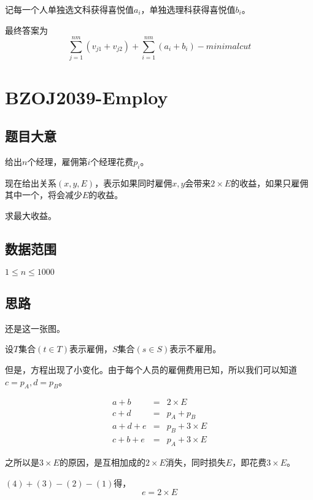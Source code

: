 \documentclass{ctexart}
\numberwithin{equation}{section}
\begin{document}
\begin{flushleft}
   记每一个人单独选文科获得喜悦值$a_i$，单独选理科获得喜悦值$b_i$。

   最终答案为$$\sum_{j=1}^{nm}(v_{j1}+v_{j2}) + \sum_{i=1}^{nm}(a_i+b_i) - minimalcut$$

   \newpage
     
   \section{BZOJ2039-Employ}
  \subsection{题目大意}
  给出$n$个经理，雇佣第$i$个经理花费$p_i$。

  现在给出关系$(x,y,E)$，表示如果同时雇佣$x,y$会带来$2\times E$的收益，如果只雇佣其中一个，将会减少$E$的收益。

  求最大收益。
  
  \subsection{数据范围}
  $1\le n \le 1000$
  \subsection{思路}
  还是这一张图。

  \begin{figure}[htb]        


  \end{figure}


  设$T$集合$(t\in T)$表示雇佣，$S$集合$(s\in S)$表示不雇用。

  但是，方程出现了小变化。由于每个人员的雇佣费用已知，所以我们可以知道$c=p_A,d=p_B$。

   \begin{eqnarray} 
    a + b &=&  2\times E \\
    c + d &=&  p_A+p_B\\
    a + d + e &=& p_B+3\times E\\
    c + b + e &=& p_A+3\times E
   \end{eqnarray}

   之所以是$3\times E$的原因，是互相加成的$2\times E$消失，同时损失$E$，即花费$3\times E$。
   
   \newpage
   
   $(4)+(3)-(2)-(1)$得，$$e=2\times E$$
   

\end{flushleft}
\end{document}
